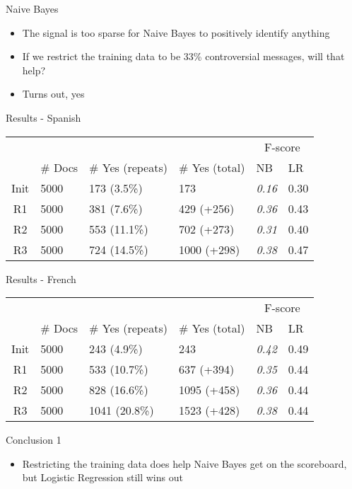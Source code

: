 \documentclass{beamer}
\begin{document}
\begin{frame}{Naive Bayes}
\begin{itemize}
\item The signal is too sparse for Naive Bayes to positively identify anything
\item If we restrict the training data to be 33\% controversial messages, will that help?
\item Turns out, yes
\end{itemize}
\end{frame}

\begin{frame}{Results - Spanish}
\begin{center}
\begin{tabular}{|c|l|l|l|l|l|}
\rowcolor{gray!50} &&&& \multicolumn{2}{|c|}{F-score} \\
\rowcolor{gray!50} & \#  Docs & \# Yes (repeats) & \# Yes (total) & NB & LR \\
Init & 5000 & 173 (3.5\%) & 173 & \emph{0.16} & 0.30 \\
R1 & 5000 & 381 (7.6\%) & 429 (+256) & \emph{0.36} & 0.43 \\
R2 & 5000 & 553 (11.1\%) & 702 (+273) & \emph{0.31} & 0.40 \\
R3 & 5000 & 724 (14.5\%) & 1000 (+298) & \emph{0.38}  & 0.47
\end{tabular}\end{center}
\end{frame}


\begin{frame}{Results - French}
\begin{center}
\begin{tabular}{|c|l|l|l|l|l|}
\rowcolor{gray!50} &&&& \multicolumn{2}{|c|}{F-score} \\
\rowcolor{gray!50} & \#  Docs & \# Yes (repeats) & \# Yes (total) & NB & LR \\
Init & 5000 & 243 (4.9\%) & 243 & \emph{0.42} & 0.49 \\
R1 & 5000 & 533 (10.7\%) & 637 (+394)& \emph{0.35} & 0.44 \\
R2 & 5000 & 828 (16.6\%) & 1095 (+458)& \emph{0.36} & 0.44 \\
R3 & 5000 & 1041 (20.8\%) & 1523 (+428)& \emph{0.38} & 0.44 \\
\end{tabular}\end{center}
\end{frame}

\begin{frame}{Conclusion 1}
\begin{itemize}
\item Restricting the training data does help Naive Bayes get on the scoreboard, but Logistic Regression still wins out
\end{itemize}
\end{frame}
\end{document}
